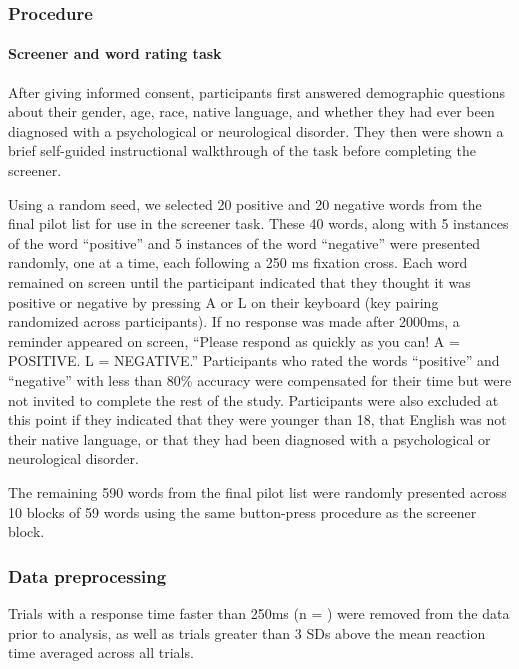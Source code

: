 \documentclass[man]{apa6}
\let\oldparagraph\paragraph
\renewcommand{\paragraph}[1]{\oldparagraph{#1}\mbox{}}
\begin{document}
\hypertarget{procedure}{%
\subsubsection{Procedure}\label{procedure}}

\hypertarget{screener-and-word-rating-task}{%
\paragraph{Screener and word rating task}\label{screener-and-word-rating-task}}

After giving informed consent, participants first answered demographic questions about their gender, age, race, native language, and whether they had ever been diagnosed with a psychological or neurological disorder. They then were shown a brief self-guided instructional walkthrough of the task before completing the screener.

Using a random seed, we selected 20 positive and 20 negative words from the final pilot list for use in the screener task. These 40 words, along with 5 instances of the word \enquote{positive} and 5 instances of the word \enquote{negative} were presented randomly, one at a time, each following a 250 ms fixation cross. Each word remained on screen until the participant indicated that they thought it was positive or negative by pressing A or L on their keyboard (key pairing randomized across participants). If no response was made after 2000ms, a reminder appeared on screen, \enquote{Please respond as quickly as you can! A = POSITIVE. L = NEGATIVE.} Participants who rated the words \enquote{positive} and \enquote{negative} with less than 80\% accuracy were compensated for their time but were not invited to complete the rest of the study. Participants were also excluded at this point if they indicated that they were younger than 18, that English was not their native language, or that they had been diagnosed with a psychological or neurological disorder.

The remaining 590 words from the final pilot list were randomly presented across 10 blocks of 59 words using the same button-press procedure as the screener block.

\hypertarget{data-preprocessing}{%
\subsubsection{Data preprocessing}\label{data-preprocessing}}

Trials with a response time faster than 250ms (n = ) were removed from the data prior to analysis, as well as trials greater than 3 SDs above the mean reaction time averaged across all trials.
\end{document}
